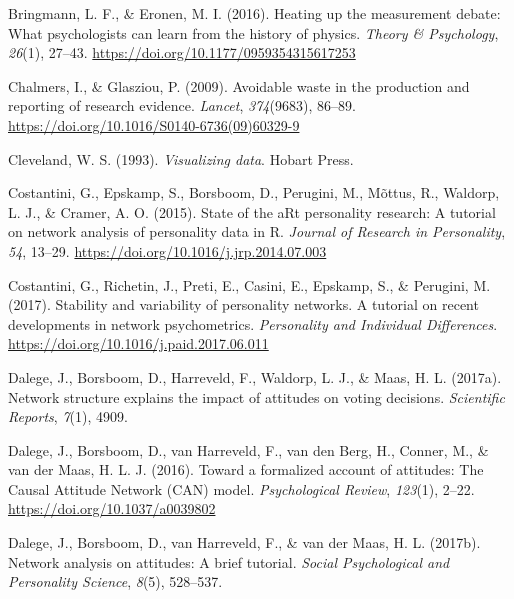 \documentclass[british,man]{apa6}
\begin{document}
\leavevmode\hypertarget{ref-bringmannHeatingMeasurementDebate2016}{}%
Bringmann, L. F., \& Eronen, M. I. (2016). Heating up the measurement debate: What psychologists can learn from the history of physics. \emph{Theory \& Psychology}, \emph{26}(1), 27--43. \url{https://doi.org/10.1177/0959354315617253}

\leavevmode\hypertarget{ref-chalmersAvoidableWasteProduction2009}{}%
Chalmers, I., \& Glasziou, P. (2009). Avoidable waste in the production and reporting of research evidence. \emph{Lancet}, \emph{374}(9683), 86--89. \url{https://doi.org/10.1016/S0140-6736(09)60329-9}

\leavevmode\hypertarget{ref-clevelandVisualizingData1993}{}%
Cleveland, W. S. (1993). \emph{Visualizing data}. Hobart Press.

\leavevmode\hypertarget{ref-costantiniStateARtPersonality2015}{}%
Costantini, G., Epskamp, S., Borsboom, D., Perugini, M., Mõttus, R., Waldorp, L. J., \& Cramer, A. O. (2015). State of the aRt personality research: A tutorial on network analysis of personality data in R. \emph{Journal of Research in Personality}, \emph{54}, 13--29. \url{https://doi.org/10.1016/j.jrp.2014.07.003}

\leavevmode\hypertarget{ref-costantiniStabilityVariabilityPersonality2017}{}%
Costantini, G., Richetin, J., Preti, E., Casini, E., Epskamp, S., \& Perugini, M. (2017). Stability and variability of personality networks. A tutorial on recent developments in network psychometrics. \emph{Personality and Individual Differences}. \url{https://doi.org/10.1016/j.paid.2017.06.011}

\leavevmode\hypertarget{ref-dalegeNetworkStructureExplains2017}{}%
Dalege, J., Borsboom, D., Harreveld, F., Waldorp, L. J., \& Maas, H. L. (2017a). Network structure explains the impact of attitudes on voting decisions. \emph{Scientific Reports}, \emph{7}(1), 4909.

\leavevmode\hypertarget{ref-dalegeFormalizedAccountAttitudes2016}{}%
Dalege, J., Borsboom, D., van Harreveld, F., van den Berg, H., Conner, M., \& van der Maas, H. L. J. (2016). Toward a formalized account of attitudes: The Causal Attitude Network (CAN) model. \emph{Psychological Review}, \emph{123}(1), 2--22. \url{https://doi.org/10.1037/a0039802}

\leavevmode\hypertarget{ref-dalegeNetworkAnalysisAttitudes2017}{}%
Dalege, J., Borsboom, D., van Harreveld, F., \& van der Maas, H. L. (2017b). Network analysis on attitudes: A brief tutorial. \emph{Social Psychological and Personality Science}, \emph{8}(5), 528--537.
\end{document}
